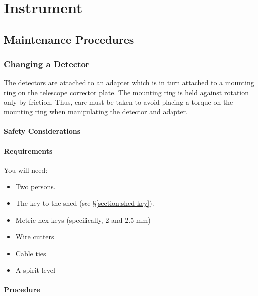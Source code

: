 
\chapter{Instrument}

\section{Maintenance Procedures}

\subsection{Changing a Detector}

The detectors are attached to an adapter which is in turn attached to a mounting ring on the telescope corrector plate. The mounting ring is held against rotation only by friction. Thus, care must be taken to avoid placing a torque on the mounting ring when manipulating the detector and adapter.

\subsubsection{Safety Considerations}



\subsubsection{Requirements}

You will need:

\begin{itemize}
\item Two persons.
\item The key to the shed (see \S\ref{section:shed-key}).
\item Metric hex keys (specifically, 2 and 2.5 mm)
\item Wire cutters
\item Cable ties
\item A spirit level
\end{itemize}

\subsubsection{Procedure}

